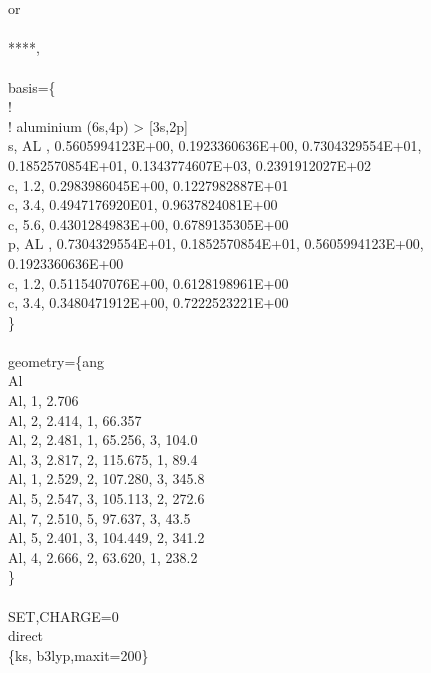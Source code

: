\documentclass[letterpaper,10pt,english]{sphinxmanual}
\begin{document}
\begin{fulllineitems}
\begin{fulllineitems}
 \\
 \\or 
 \\
 \\****,
 \\
 \\basis=\{
 \\!
 \\! aluminium            (6s,4p) \sphinxhyphen{}\textgreater{} {[}3s,2p{]}
 \\s, AL , 0.5605994123E+00, 0.1923360636E+00, 0.7304329554E+01, 0.1852570854E+01, 0.1343774607E+03, 0.2391912027E+02
 \\c, 1.2, \sphinxhyphen{}0.2983986045E+00, 0.1227982887E+01
 \\c, 3.4, 0.4947176920E\sphinxhyphen{}01, 0.9637824081E+00
 \\c, 5.6, 0.4301284983E+00, 0.6789135305E+00
 \\p, AL , 0.7304329554E+01, 0.1852570854E+01, 0.5605994123E+00, 0.1923360636E+00
 \\c, 1.2, 0.5115407076E+00, 0.6128198961E+00
 \\c, 3.4, 0.3480471912E+00, 0.7222523221E+00
 \\\}
 \\
 \\geometry=\{ang
 \\Al
 \\Al,  1,     2.706
 \\Al,  2,     2.414,     1,      66.357
 \\Al,  2,     2.481,     1,      65.256,       3,     104.0
 \\Al,  3,     2.817,     2,      115.675,      1,     89.4
 \\Al,  1,     2.529,     2,      107.280,      3,     345.8
 \\Al,  5,     2.547,     3,      105.113,      2,     272.6
 \\Al,  7,     2.510,     5,      97.637,       3,     43.5
 \\Al,  5,     2.401,     3,      104.449,      2,     341.2
 \\Al,  4,     2.666,     2,      63.620,       1,     238.2
 \\\}
 \\
 \\SET,CHARGE=0
 \\direct
 \\\{ks, b3lyp,maxit=200\}
 \\
 \\\sphinxhyphen{}\sphinxhyphen{}\sphinxhyphen{}

\end{fulllineitems}
\end{fulllineitems}
\end{document}
